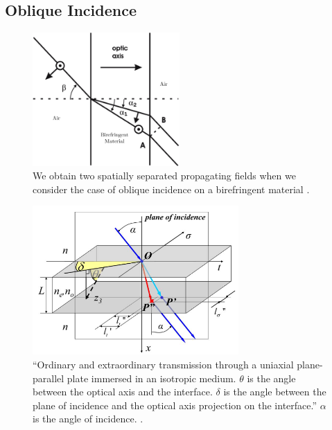 \documentclass{optica-article}
\begin{document}
\subsection{Oblique Incidence}
\begin{figure}[htbp]
  \centering
  \includegraphics[width=0.5\textwidth]{figs/Birefringence.png}
  \caption{
      We obtain two spatially separated propagating fields when 
      we consider
      the case of oblique incidence on a birefringent 
      material \cite{BR_IM}.
  }
  \label{fig:BR}
\end{figure}
\begin{figure}[h]
  \centering
  \includegraphics[width=0.7\textwidth]{figs/WP_OI_setup.PNG}
  \caption{ ``Ordinary and extraordinary transmission
  through a uniaxial plane-parallel plate immersed in an isotropic
  medium. $\theta$ is the angle between the optical axis and the interface. 
  $\delta$ is the angle between the plane of incidence and the optical axis 
  projection on the interface.'' $\alpha$ is the angle of incidence.
  \cite{OBI_phase}. }
  \label{fig:obi_set}
\end{figure}
\end{document}
